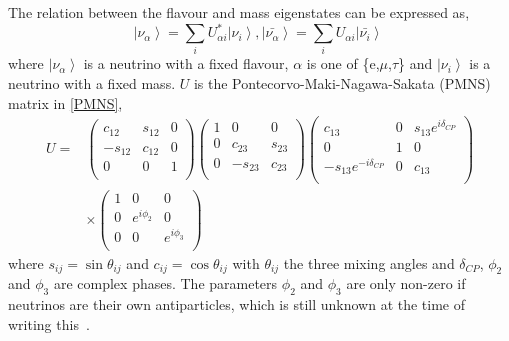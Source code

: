The relation between the flavour and mass eigenstates can be expressed as,
\begin{equation}
\label{eq:eigenstates}
 \left| \nu_\alpha \right\rangle = \sum_{i} U^{*}_{\alpha i} \left| \nu_i \right\rangle,
 \left| \bar{\nu_\alpha} \right\rangle = \sum_{i} U_{\alpha i} \left| \bar{\nu_i} \right\rangle\
 \end{equation}
where
 $\left| \nu_\alpha \right\rangle $ is a neutrino with a fixed flavour, $\alpha$ is one of \{e,$\mu$,$\tau$\} and  $\left| \nu_i \right\rangle$ is a neutrino with a fixed mass.
$U$ is the Pontecorvo-Maki-Nagawa-Sakata (PMNS) matrix in \eqref{PMNS},
\begin{equation}
\label{PMNS}
\begin{aligned}
U ={} & 
 \begin{pmatrix}
 c_{12} & s_{12} & 0\\
  -s_{12} & c_{12} & 0\\
  0 & 0 & 1\\
 \end{pmatrix} 
  \begin{pmatrix}
 1 & 0 & 0\\
  0 & c_{23} & s_{23}\\
  0 & -s_{23} & c_{23}\\
 \end{pmatrix} 
   \begin{pmatrix}
 c_{13} & 0 & s_{13}e^{i\delta_{CP}}\\
  0 & 1 & 0\\
  -s_{13}e^{-i\delta_{CP}} & 0 & c_{13}\\
 \end{pmatrix} 
 \\
 & \times
  \begin{pmatrix}
1 & 0& 0\\
  0 & e^{i\phi_2} & 0\\
  0 & 0 & e^{i\phi_3}\\
 \end{pmatrix} 
 \end{aligned}
\end{equation}
where $s_{ij} = \sin\theta_{ij}$ and $c_{ij} = \cos\theta_{ij}$ with $\theta_{ij}$ the three mixing angles and $\delta_{CP}$, $\phi_2$ and $\phi_3$ are complex phases. The parameters $\phi_2$ and $\phi_3$ are only non-zero if neutrinos are their own antiparticles, which is still unknown at the time of writing this~\cite{13PDG}.

